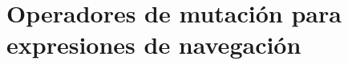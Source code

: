 \documentclass[11pt,a4paper]{report} %
\begin{document}
\frenchspacing
\raggedbottom

\pagestyle{plain}
%


\cleardoublepage\null

\cleardoublepage%
%
\pagestyle{scrheadings}
\pagestyle{headings}
\cleardoublepage

\cleardoublepage




%

\part{Operadores de mutaci\'on para expresiones de navegaci\'on} 
\cleardoublepage\null






%

%

\cleardoublepage\null
%

%
%
{}

\end{document}
